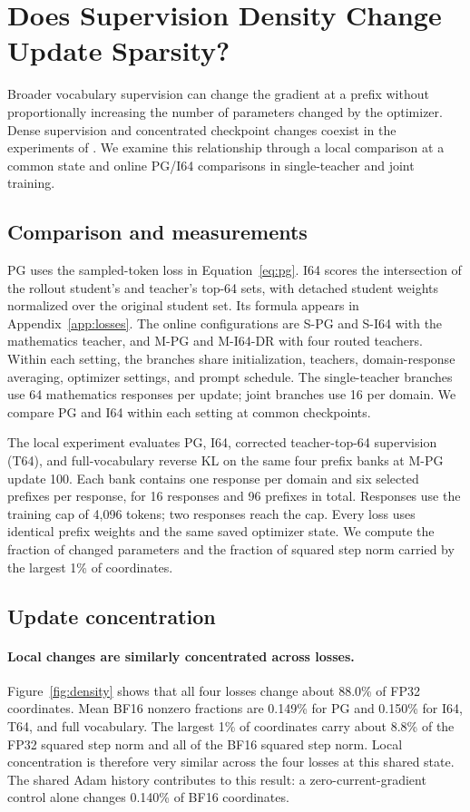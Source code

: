 \section{Does Supervision Density Change Update Sparsity?}
\label{sec:density}

Broader vocabulary supervision can change the gradient at a prefix without proportionally increasing the number of parameters changed by the optimizer. Dense supervision and concentrated checkpoint changes coexist in the experiments of \citet{yu2026denseupdates}. We examine this relationship through a local comparison at a common state and online PG/I64 comparisons in single-teacher and joint training.

\subsection{Comparison and measurements}

PG uses the sampled-token loss in Equation~\ref{eq:pg}. I64 scores the intersection of the rollout student's and teacher's top-64 sets, with detached student weights normalized over the original student set. Its formula appears in Appendix~\ref{app:losses}. The online configurations are S-PG and S-I64 with the mathematics teacher, and M-PG and M-I64-DR with four routed teachers. Within each setting, the branches share initialization, teachers, domain-response averaging, optimizer settings, and prompt schedule. The single-teacher branches use 64 mathematics responses per update; joint branches use 16 per domain. We compare PG and I64 within each setting at common checkpoints.

The local experiment evaluates PG, I64, corrected teacher-top-64 supervision (T64), and full-vocabulary reverse KL on the same four prefix banks at M-PG update 100. Each bank contains one response per domain and six selected prefixes per response, for 16 responses and 96 prefixes in total. Responses use the training cap of 4,096 tokens; two responses reach the cap. Every loss uses identical prefix weights and the same saved optimizer state. We compute the fraction of changed parameters and the fraction of squared step norm carried by the largest 1\% of coordinates.

\subsection{Update concentration}

\paragraph{Local changes are similarly concentrated across losses.}
Figure~\ref{fig:density} shows that all four losses change about 88.0\% of FP32 coordinates. Mean BF16 nonzero fractions are 0.149\% for PG and 0.150\% for I64, T64, and full vocabulary. The largest 1\% of coordinates carry about 8.8\% of the FP32 squared step norm and all of the BF16 squared step norm. Local concentration is therefore very similar across the four losses at this shared state. The shared Adam history contributes to this result: a zero-current-gradient control alone changes 0.140\% of BF16 coordinates.

